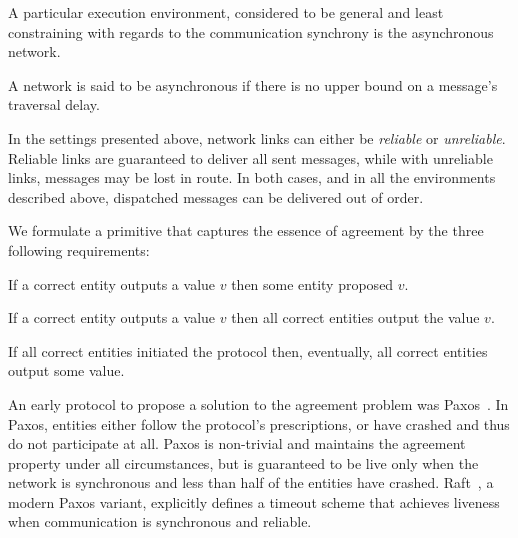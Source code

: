 \noindent A particular execution environment, considered to be general and least constraining with regards to the communication synchrony is the asynchronous network.
\begin{definition}
A network is said to be asynchronous if there is no upper bound on a message's traversal delay.
\end{definition}
\noindent In the settings presented above, network links can either be \emph{reliable} or \emph{unreliable}. Reliable links are guaranteed to deliver all sent messages, while with unreliable links, messages may be lost in route. In both cases, and in all the environments described above, dispatched messages can be delivered out of order. 

We formulate a primitive that captures the essence of agreement by the three following requirements:

\begin{definition} 
If a correct entity outputs a value $v$ then some entity proposed $v$.
\end{definition}

\begin{definition}[Agreement]
If a correct entity outputs a value $v$ then all correct entities output the value $v$.
\end{definition}

\begin{definition}[Liveness]
If all correct entities initiated the protocol then, eventually, all correct entities output some value. 
\end{definition}

An early protocol to propose a solution to the agreement problem was Paxos~\cite{Paxos}. In Paxos, entities either follow the protocol's prescriptions, or have crashed and thus do not participate at all. Paxos is non-trivial and maintains the agreement property under all circumstances, but is guaranteed to be live only when the network is synchronous and less than half of the entities have crashed. Raft~\cite{Raft}, a modern Paxos variant, explicitly defines a timeout scheme that achieves liveness when communication is synchronous and reliable.


